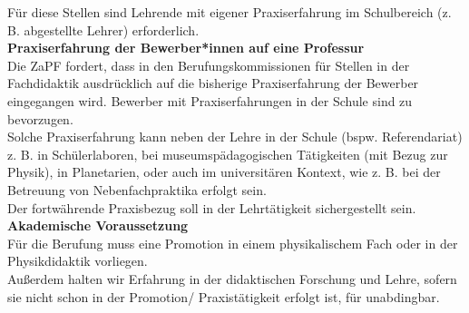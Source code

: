 Für diese Stellen sind Lehrende mit eigener Praxiserfahrung im Schulbereich (z. B. abgestellte Lehrer) erforderlich.
\vspace{0.5\baselineskip}\\
\textbf{Praxiserfahrung der Bewerber*innen auf eine Professur}\\
Die ZaPF fordert, dass in den Berufungskommissionen für Stellen in der Fachdidaktik ausdrücklich auf die bisherige Praxiserfahrung der Bewerber eingegangen wird. Bewerber mit Praxiserfahrungen in der Schule sind zu bevorzugen.\\
Solche Praxiserfahrung kann neben der Lehre in der Schule (bspw. Referendariat) z. B. in Schülerlaboren, bei museumspädagogischen Tätigkeiten (mit Bezug zur Physik), in Planetarien, oder auch im universitären Kontext, wie z. B. bei der Betreuung von Nebenfachpraktika erfolgt sein.\\
Der fortwährende Praxisbezug soll in der Lehrtätigkeit sichergestellt sein.
\vspace{0.5\baselineskip}\\
\textbf{Akademische Voraussetzung}\\
Für die Berufung muss eine Promotion in einem physikalischem Fach oder in der Physikdidaktik vorliegen.\\
Außerdem halten wir Erfahrung in der didaktischen Forschung und Lehre, sofern sie nicht schon in der Promotion/ Praxistätigkeit erfolgt ist, für unabdingbar.
